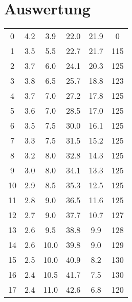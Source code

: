 \section{Auswertung}
\label{sec:Auswertung}



\begin{table}
    \centering
    \begin{tabular}{S[table-format=2.0] S[table-format=1.1] S[table-format=2.1] S[table-format=2.1] S[table-format=2.1] S[table-format=3.0]}
        \toprule
     &  &  &  &  &  \\
         & 4.2 & 3.9 & 22.0 & 21.9 & 0 \\
        1 & 3.5 & 5.5 & 22.7 & 21.7 & 115 \\
        2 & 3.7 & 6.0 & 24.1 & 20.3 & 125 \\
        3 & 3.8 & 6.5 & 25.7 & 18.8 & 123 \\
        4 & 3.7 & 7.0 & 27.2 & 17.8 & 125\\
        5 & 3.6 & 7.0 & 28.5 & 17.0 & 125\\
        6 & 3.5 & 7.5 & 30.0 & 16.1 & 125\\
        7 & 3.3 & 7.5 & 31.5 & 15.2 & 125\\
        8 & 3.2 & 8.0 & 32.8 & 14.3 & 125\\
        9 & 3.0 & 8.0 & 34.1 & 13.3 & 125\\
        10 & 2.9 & 8.5 & 35.3 & 12.5 & 125\\
        11 & 2.8 & 9.0 & 36.5 & 11.6 & 125\\
        12 & 2.7 & 9.0 & 37.7 & 10.7 & 127\\
        13 & 2.6 & 9.5 & 38.8 & 9.9 & 128\\
        14 & 2.6 & 10.0 & 39.8 & 9.0 & 129\\
        15 & 2.5 & 10.0 & 40.9 & 8.2 & 130\\
        16 & 2.4 & 10.5 & 41.7 & 7.5 & 130\\
        17 & 2.4 & 11.0 & 42.6 & 6.8 & 120\\

\end{tabular}
\end{table}
